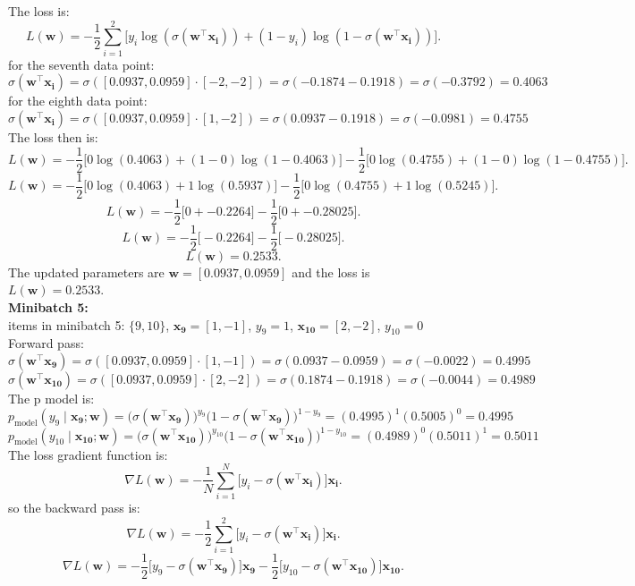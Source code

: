 \documentclass[a3paper,12pt]{article} %
\begin{document}
The loss is:
\[
L(\mathbf{w}) = -\frac{1}{2} \sum^2_{i=1} \big[y_i \log(\sigma(\mathbf{w}^\top \mathbf{x_i})) + (1-y_i) \log(1-\sigma(\mathbf{w}^\top \mathbf{x_i}))\big].
\]
for the seventh data point:
\[
    \sigma(\mathbf{w}^\top \mathbf{x_i}) = \sigma([0.0937, 0.0959] \cdot [-2, -2]) = \sigma(-0.1874 - 0.1918) = \sigma(-0.3792) = 0.4063
\]
for the eighth data point:
\[
    \sigma(\mathbf{w}^\top \mathbf{x_i}) = \sigma([0.0937, 0.0959] \cdot [1, -2]) = \sigma(0.0937 - 0.1918) = \sigma(-0.0981) = 0.4755
\]
The loss then is:
\[
L(\mathbf{w}) = -\frac{1}{2} \big[0 \log(0.4063) + (1-0) \log(1-0.4063)\big] - \frac{1}{2} \big[0 \log(0.4755) + (1-0) \log(1-0.4755)\big].
\]
\[
L(\mathbf{w}) = -\frac{1}{2} \big[0 \log(0.4063) + 1 \log(0.5937)\big] - \frac{1}{2} \big[0 \log(0.4755) + 1 \log(0.5245)\big].
\]
\[
L(\mathbf{w}) = -\frac{1}{2} \big[0 + -0.2264\big] - \frac{1}{2} \big[0 + -0.28025\big].
\]
\[
L(\mathbf{w}) = -\frac{1}{2} \big[-0.2264\big] - \frac{1}{2} \big[-0.28025\big].
\]
\[
L(\mathbf{w}) = 0.2533.
\]
The updated parameters are \(\mathbf{w} = \mathbf{[0.0937, 0.0959]}\) and the loss is \(L(\mathbf{w}) = \mathbf{0.2533}\).
\\ \textbf{Minibatch 5:}
\\ items in minibatch 5: \(\{9, 10\}\), \(\mathbf{x_9} = [1, -1]\), \(y_9 = 1\), \(\mathbf{x_{10}} = [2, -2]\), \(y_{10} = 0\)
\\ Forward pass:
\[
\sigma(\mathbf{w}^\top \mathbf{x_9}) = \sigma([0.0937, 0.0959] \cdot [1, -1]) = \sigma(0.0937 - 0.0959) = \sigma(-0.0022) = 0.4995
\]
\[
\sigma(\mathbf{w}^\top \mathbf{x_{10}}) = \sigma([0.0937, 0.0959] \cdot [2, -2]) = \sigma(0.1874 - 0.1918) = \sigma(-0.0044) = 0.4989
\]
The p model is:
\[
p_{\text{model}}(y_9 \mid \mathbf{x_9}; \mathbf{w}) = \big(\sigma(\mathbf{w}^\top \mathbf{x_9})\big)^{y_9} \big(1 - \sigma(\mathbf{w}^\top \mathbf{x_9})\big)^{1-y_9} = (0.4995)^1 (0.5005)^0 = 0.4995
\]
\[
p_{\text{model}}(y_{10} \mid \mathbf{x_{10}}; \mathbf{w}) = \big(\sigma(\mathbf{w}^\top \mathbf{x_{10}})\big)^{y_{10}} \big(1 - \sigma(\mathbf{w}^\top \mathbf{x_{10}})\big)^{1-y_{10}} = (0.4989)^0 (0.5011)^1 = 0.5011
\]
The loss gradient function is:
\[
\nabla L(\mathbf{w}) = -\frac{1}{N} \sum^N_{i=1} \big[y_i - \sigma(\mathbf{w}^\top \mathbf{x_i})\big] \mathbf{x_i}.
\]
so the backward pass is:
\[
\nabla L(\mathbf{w}) = -\frac{1}{2} \sum^2_{i=1} \big[y_i - \sigma(\mathbf{w}^\top \mathbf{x_i})\big] \mathbf{x_i}.
\]
\[
\nabla L(\mathbf{w}) = -\frac{1}{2} \big[y_9 - \sigma(\mathbf{w}^\top \mathbf{x_9})\big] \mathbf{x_9} - \frac{1}{2} \big[y_{10} - \sigma(\mathbf{w}^\top \mathbf{x_{10}})\big] \mathbf{x_{10}}.
\]
\end{document}
